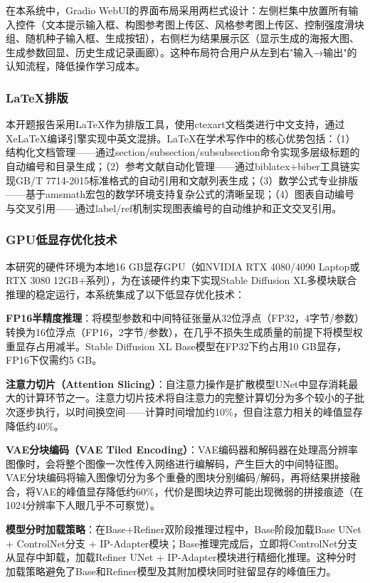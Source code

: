 \documentclass[12pt,a4paper]{ctexart}
\newcommand{\sdxl}{Stable Diffusion XL}
\begin{document}
在本系统中，Gradio WebUI的界面布局采用两栏式设计：左侧栏集中放置所有输入控件（文本提示输入框、构图参考图上传区、风格参考图上传区、控制强度滑块组、随机种子输入框、生成按钮），右侧栏为结果展示区（显示生成的海报大图、生成参数回显、历史生成记录画廊）。这种布局符合用户从左到右"输入→输出"的认知流程，降低操作学习成本。

\subsubsection{LaTeX排版}

本开题报告采用LaTeX作为排版工具，使用ctexart文档类进行中文支持，通过XeLaTeX编译引擎实现中英文混排。LaTeX在学术写作中的核心优势包括：（1）结构化文档管理——通过section/subsection/subsubsection命令实现多层级标题的自动编号和目录生成；（2）参考文献自动化管理——通过biblatex+biber工具链实现GB/T 7714-2015标准格式的自动引用和文献列表生成；（3）数学公式专业排版——基于amsmath宏包的数学环境支持复杂公式的清晰呈现；（4）图表自动编号与交叉引用——通过label/ref机制实现图表编号的自动维护和正文交叉引用。

\subsubsection{GPU低显存优化技术}

本研究的硬件环境为本地16 GB显存GPU（如NVIDIA RTX 4080/4090 Laptop或RTX 3080 12GB+系列），为在该硬件约束下实现\sdxl{}多模块联合推理的稳定运行，本系统集成了以下低显存优化技术：

\textbf{FP16半精度推理}：将模型参数和中间特征张量从32位浮点（FP32，4字节/参数）转换为16位浮点（FP16，2字节/参数），在几乎不损失生成质量的前提下将模型权重显存占用减半。\sdxl{} Base模型在FP32下约占用10 GB显存，FP16下仅需约5 GB。

\textbf{注意力切片（Attention Slicing）}：自注意力操作是扩散模型UNet中显存消耗最大的计算环节之一。注意力切片技术将自注意力的完整计算切分为多个较小的子批次逐步执行，以时间换空间——计算时间增加约10\%，但自注意力相关的峰值显存降低约40\%。

\textbf{VAE分块编码（VAE Tiled Encoding）}：VAE编码器和解码器在处理高分辨率图像时，会将整个图像一次性传入网络进行编解码，产生巨大的中间特征图。VAE分块编码将输入图像切分为多个重叠的图块分别编码/解码，再将结果拼接融合，将VAE的峰值显存降低约60\%，代价是图块边界可能出现微弱的拼接痕迹（在1024分辨率下人眼几乎不可察觉）。

\textbf{模型分时加载策略}：在Base+Refiner双阶段推理过程中，Base阶段加载Base UNet + ControlNet分支 + IP-Adapter模块；Base推理完成后，立即将ControlNet分支从显存中卸载，加载Refiner UNet + IP-Adapter模块进行精细化推理。这种分时加载策略避免了Base和Refiner模型及其附加模块同时驻留显存的峰值压力。
\end{document}
